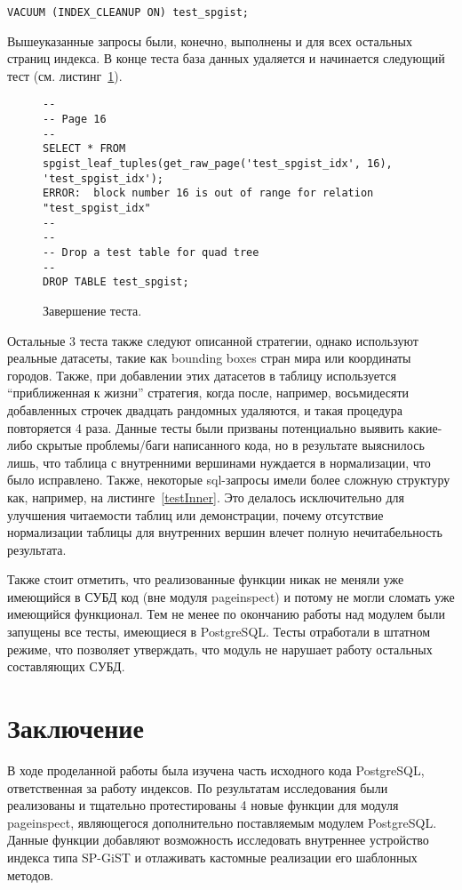 \documentclass[12pt,oneside]{amsart}
\begin{document}
\begin{lstlisting}
VACUUM (INDEX_CLEANUP ON) test_spgist;
\end{lstlisting}

Вышеуказанные запросы были, конечно, выполнены и для всех остальных страниц индекса. В конце теста база данных удаляется и начинается следующий тест (см. листинг~\ref{test_end}).

\begin{figure}[ht]
\begin{lstlisting}
--
-- Page 16
--
SELECT * FROM spgist_leaf_tuples(get_raw_page('test_spgist_idx', 16), 'test_spgist_idx');
ERROR:  block number 16 is out of range for relation "test_spgist_idx"
--
--
-- Drop a test table for quad tree
--
DROP TABLE test_spgist;
\end{lstlisting}
\caption{Завершение теста.}\label{test_end}
\end{figure}

Остальные 3 теста также следуют описанной стратегии, однако используют реальные датасеты, такие как bounding boxes стран мира или координаты городов. Также, при добавлении этих датасетов в таблицу используется ``приближенная к жизни'' стратегия, когда после, например, восьмидесяти добавленных строчек двадцать рандомных удаляются, и такая процедура повторяется 4 раза. Данные тесты были призваны потенциально выявить какие-либо скрытые проблемы/баги написанного кода, но в результате выяснилось лишь, что таблица с внутренними вершинами нуждается в нормализации, что было исправлено. Также, некоторые sql-запросы имели более сложную структуру как, например, на листинге~\ref{testInner}. Это делалось исключительно для улучшения читаемости таблиц или демонстрации, почему отсутствие нормализации таблицы для внутренних вершин влечет полную нечитабельность результата.

Также стоит отметить, что реализованные функции никак не меняли уже имеющийся в СУБД код (вне модуля pageinspect) и потому не могли сломать уже имеющийся функционал. Тем не менее по окончанию работы над модулем были запущены все тесты, имеющиеся в PostgreSQL. Тесты отработали в штатном режиме, что позволяет утверждать, что модуль не нарушает работу остальных составляющих СУБД.


\clearpage
\section*{Заключение}

В ходе проделанной работы была изучена часть исходного кода PostgreSQL, ответственная за работу индексов. По результатам исследования были реализованы и тщательно протестированы 4 новые функции для модуля pageinspect, являющегося дополнительно поставляемым модулем PostgreSQL. Данные функции добавляют возможность исследовать внутреннее устройство индекса типа SP-GiST и отлаживать кастомные реализации его шаблонных методов.
\end{document}
